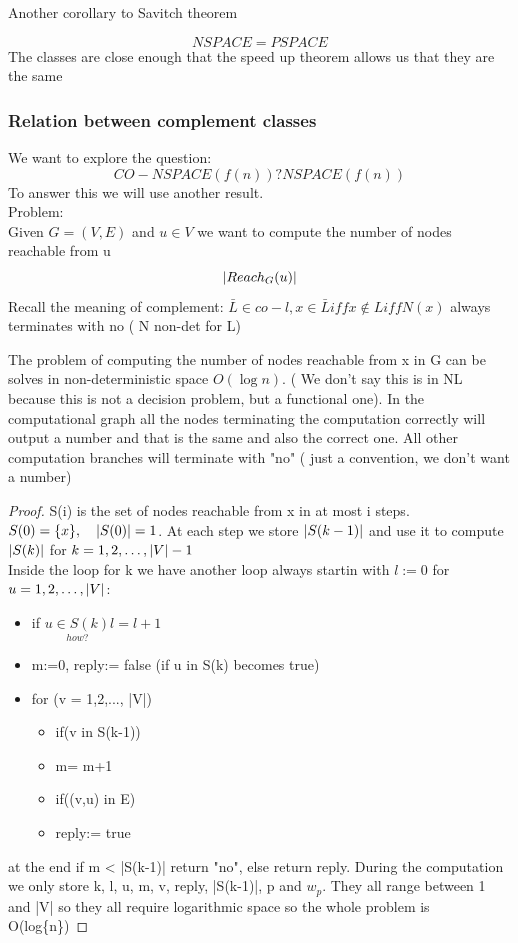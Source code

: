 Another corollary to Savitch theorem
\begin{corollary}
    \[ 
        NSPACE = PSPACE 
    \]
    The classes are close enough that the speed up theorem allows us that they are the same
\end{corollary}

\subsubsection*{Relation between complement classes}
We want to explore the question:
\[ 
    CO-NSPACE(f(n)) ? NSPACE(f(n)) 
\]
To answer this we will use another result.\\
Problem:\\
Given $ G=(V,E) $ and $u \in V$ we want to compute the number of nodes reachable from u
\[ 
    \left\lvert Reach_G(u)\right\rvert 
\]
Recall the meaning of complement: $\bar{L} \in co-l, x \in \bar{L} iff x\notin L iff N(x)$ always terminates with no ( N non-det for L)
\begin{theorem}
    The problem of computing the number of nodes reachable from x in G can be solves in non-deterministic space $O(\log{n})$. ( We don't say this is in NL because this is not a decision problem, but a functional one). In the computational graph all the nodes terminating the computation correctly will output a number and that is the same and also the correct one. All other computation branches will terminate with "no" ( just a convention, we don't want a number)
    \begin{proof}
        S(i) is the set of nodes reachable from x in at most i steps.\\
       $ S(0) = \{x\}, \quad \left\lvert S(0)\right\rvert=1$. At each step we store $\left\lvert S(k-1)\right\rvert$ and use it to compute $\left\lvert S(k)\right\rvert$ for $k = 1,2,\ldots, \left\lvert V\right\rvert-1$\\
       Inside the loop for k we have another loop always startin with $l:=0$ for $u = 1,2, \ldots, \left\lvert V\right\rvert$:
       \begin{itemize}
        \item if $\underset{how?}{u \in S(k)} l=l+1$
        \item m:=0, reply:= false (if u in S(k) becomes true)
        \item for (v = 1,2,..., |V|) \begin{itemize}
            \item if(v in S(k-1))
            \item   m= m+1
            \item   if((v,u) in E)
            \item       reply:= true
        \end{itemize}
       \end{itemize}
       at the end if m < |S(k-1)| return "no", else return reply. During the computation we only store k, l, u, m, v, reply, |S(k-1)|, p and $w_p$. They all range between 1 and |V| so they all require logarithmic space so the whole problem is O(log\{n\})
    \end{proof}
\end{theorem}
